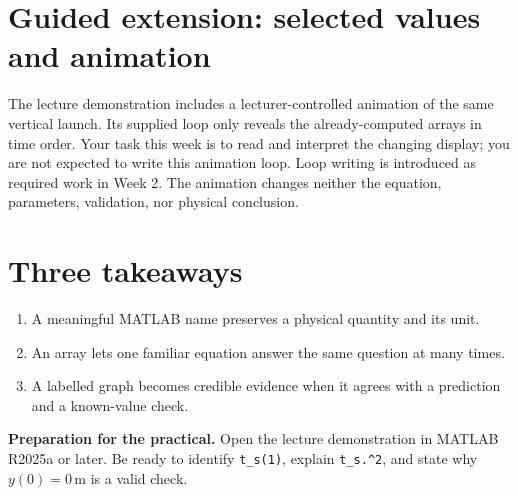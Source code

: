 \documentclass[11pt,a4paper]{article}
\newcommand{\units}[1]{\,\mathrm{#1}}
\begin{document}
\section*{Guided extension: selected values and animation}
The lecture demonstration includes a lecturer-controlled animation of the same vertical launch. Its supplied loop only reveals the already-computed arrays in time order. Your task this week is to read and interpret the changing display; you are not expected to write this animation loop. Loop writing is introduced as required work in Week 2. The animation changes neither the equation, parameters, validation, nor physical conclusion.
\section*{Three takeaways}
\begin{enumerate}[nosep,leftmargin=6mm]\item A meaningful MATLAB name preserves a physical quantity and its unit. \item An array lets one familiar equation answer the same question at many times. \item A labelled graph becomes credible evidence when it agrees with a prediction and a known-value check.\end{enumerate}
\begin{keybox}\textbf{Preparation for the practical.} Open the lecture demonstration in MATLAB R2025a or later. Be ready to identify \texttt{t\_s(1)}, explain \texttt{t\_s.\string^2}, and state why $y(0)=0\units{m}$ is a valid check.\end{keybox}
\end{document}

